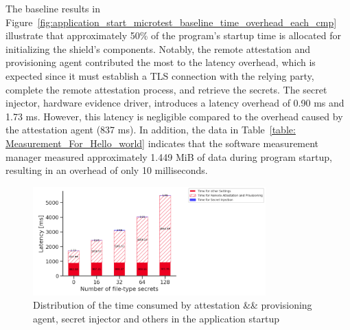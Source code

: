 The baseline results in Figure~\ref{fig:application_start_microtest_baseline_time_overhead_each_cmp} illustrate that approximately 50\% of the program's startup time is allocated for initializing the shield's components. Notably, the remote attestation and provisioning agent contributed the most to 
the latency overhead, which is expected since it must establish a TLS connection with the relying party, complete the remote attestation process, and retrieve the secrets. The secret injector, hardware evidence driver, introduces a latency overhead of 0.90 ms and 1.73 ms. However, this latency is 
negligible compared to the overhead caused by the attestation agent (837 ms). In addition, the data in Table~\ref{table: Measurement_For_Hello_world} indicates that the software measurement manager measured approximately 1.449 MiB of data during program startup, resulting in an overhead of only 
10 milliseconds. 

\begin{figure}[!htb]
    \centering
    \includegraphics[width=0.8\textwidth]{images/startup_time_change_as_file_type_secret_increasing.PNG}
    \caption[Distribution of the time consumed by attestation \&\& provisioning agent, secret injector and others in the application startup]{Distribution of the time consumed by attestation \&\& provisioning agent, secret injector and others in the application startup}
    \label{fig:startup_time_change_as_file_type_secret_increasing}
\end{figure}


